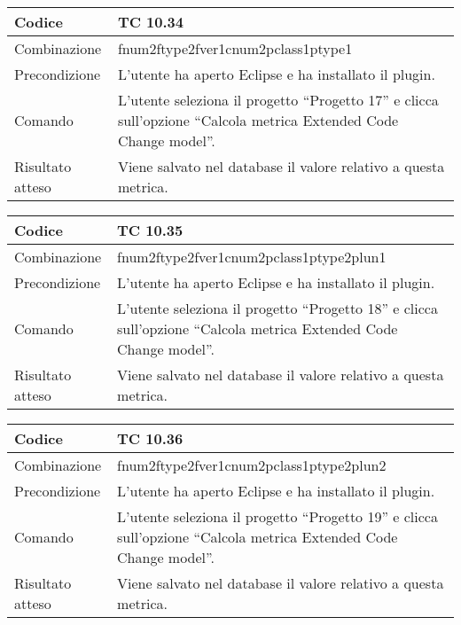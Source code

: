 \clearpage

\begin{table}[ht]
\begin{tabular}{|p{3cm}|p{9cm}|}
\hline
\cellcolor{lightgray}Codice				& TC 10.34								\\
\hline
\cellcolor{lightgray}Combinazione		& fnum2ftype2fver1cnum2pclass1ptype1									\\
\hline
\cellcolor{lightgray}Precondizione		& L'utente ha aperto Eclipse e ha installato il plugin.		\\
\hline
\cellcolor{lightgray}Comando			& L'utente seleziona il progetto ``Progetto 17''  e clicca sull'opzione ``Calcola metrica Extended Code Change model''.	\\
\hline
\cellcolor{lightgray}Risultato atteso	& Viene salvato nel database il valore relativo a questa metrica.\\
\hline
\end{tabular}
\end{table}

\begin{table}[ht]
\begin{tabular}{|p{3cm}|p{9cm}|}
\hline
\cellcolor{lightgray}Codice				& TC 10.35								\\
\hline
\cellcolor{lightgray}Combinazione		& fnum2ftype2fver1cnum2pclass1ptype2plun1									\\
\hline
\cellcolor{lightgray}Precondizione		& L'utente ha aperto Eclipse e ha installato il plugin.		\\
\hline
\cellcolor{lightgray}Comando			& L'utente seleziona il progetto ``Progetto 18''  e clicca sull'opzione ``Calcola metrica Extended Code Change model''.	\\
\hline
\cellcolor{lightgray}Risultato atteso	& Viene salvato nel database il valore relativo a questa metrica.\\
\hline
\end{tabular}
\end{table}

\begin{table}[ht]
\begin{tabular}{|p{3cm}|p{9cm}|}
\hline
\cellcolor{lightgray}Codice				& TC 10.36								\\
\hline
\cellcolor{lightgray}Combinazione		& fnum2ftype2fver1cnum2pclass1ptype2plun2									\\
\hline
\cellcolor{lightgray}Precondizione		& L'utente ha aperto Eclipse e ha installato il plugin.		\\
\hline
\cellcolor{lightgray}Comando			& L'utente seleziona il progetto ``Progetto 19''  e clicca sull'opzione ``Calcola metrica Extended Code Change model''.	\\
\hline
\cellcolor{lightgray}Risultato atteso	& Viene salvato nel database il valore relativo a questa metrica.\\
\hline
\end{tabular}
\end{table}

